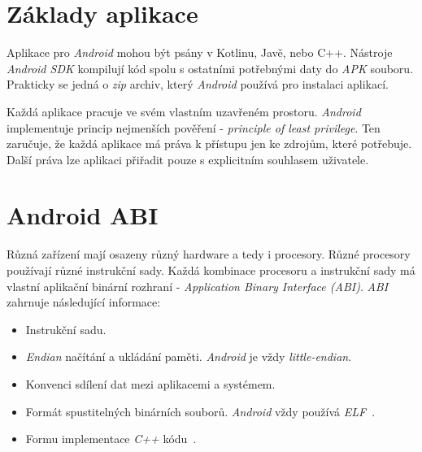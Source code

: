 \section{Základy aplikace}
Aplikace pro \emph{Android} mohou být psány v Kotlinu, Javě, nebo C++. Nástroje \emph{Android SDK} kompilují kód spolu s ostatními potřebnými daty do \emph{APK} souboru. Prakticky se jedná o \emph{zip} archiv, který \emph{Android} používá pro instalaci aplikací.

Každá aplikace pracuje ve svém vlastním uzavřeném prostoru. \emph{Android} implementuje princip nejmenších pověření - \emph{principle of least privilege}. Ten zaručuje, že každá aplikace má práva k přístupu jen ke zdrojům, které potřebuje. Další práva lze aplikaci přiřadit pouze s explicitním souhlasem uživatele.

\section{Android ABI}\label{sec:zaklady_abi}
Různá zařízení mají osazeny různý hardware a tedy i procesory. Různé procesory používají různé instrukční sady. Každá kombinace procesoru a instrukční sady má vlastní aplikační binární rozhraní - \emph{Application Binary Interface (ABI)}. \emph{ABI}~ zahrnuje následující informace:
\begin{itemize}
    \item Instrukční sadu.
    \item \emph{Endian} načítání a ukládání paměti. \emph{Android} je vždy \emph{little-endian}.
    \item Konvenci sdílení dat mezi aplikacemi a systémem.
    \item Formát spustitelných binárních souborů. \emph{Android} vždy používá \emph{ELF}~.
    \item Formu implementace \emph{C++} kódu~.
\end{itemize}

